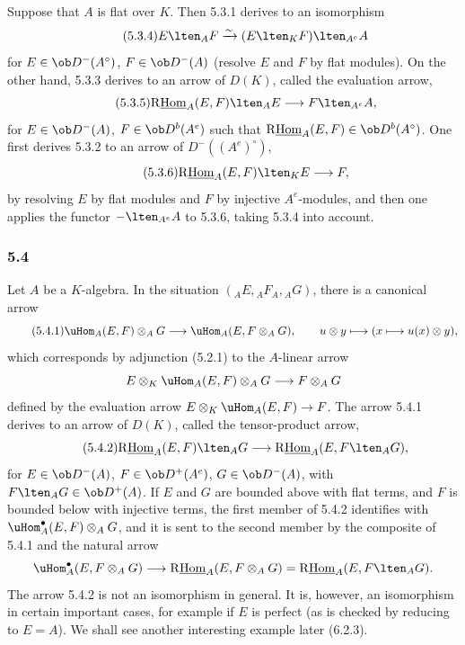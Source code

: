 Suppose that $A$ is flat over $K$. Then 5.3.1 derives to an isomorphism
\begin{equation}\tag{5.3.4}
E\lten_AF\xrightarrow{\sim}(E\lten_KF)\lten_{A^e}A
\end{equation}
for $E\in\ob D^-(A^\circ)$, $F\in\ob D^-(A)$ (resolve $E$ and $F$ by flat modules). On the other hand, 5.3.3 derives to an arrow of $D(K)$, called the evaluation arrow,
\begin{equation}\tag{5.3.5}
\mathrm{R}\underline{\mathrm{Hom}}_A(E,F)\lten_AE\longrightarrow F\lten_{A^e}A,
\end{equation}
for $E\in\ob D^-(A)$, $F\in\ob D^b(A^e)$ such that $\mathrm{R}\underline{\mathrm{Hom}}_A(E,F)\in\ob D^b(A^\circ)$. One first derives 5.3.2 to an arrow of $D^-((A^e)^\circ)$,
\begin{equation}\tag{5.3.6}
\mathrm{R}\underline{\mathrm{Hom}}_A(E,F)\lten_KE\longrightarrow F,
\end{equation}
by resolving $E$ by flat modules and $F$ by injective $A^e$-modules, and then one applies the functor $-\lten_{A^e}A$ to 5.3.6, taking 5.3.4 into account.

\subsubsection*{5.4}

Let $A$ be a $K$-algebra. In the situation $({}_AE,{}_AF_A,{}_AG)$, there is a canonical arrow
\begin{equation}\tag{5.4.1}
\uHom_A(E,F)\otimes_AG\longrightarrow\uHom_A(E,F\otimes_AG),
\qquad u\otimes y\longmapsto(x\longmapsto u(x)\otimes y),
\end{equation}
which corresponds by adjunction (5.2.1) to the $A$-linear arrow
\[
E\otimes_K\uHom_A(E,F)\otimes_AG\longrightarrow F\otimes_AG
\]
defined by the evaluation arrow $E\otimes_K\uHom_A(E,F)\to F$. The arrow 5.4.1 derives to an arrow of $D(K)$, called the tensor-product arrow,
\begin{equation}\tag{5.4.2}
\mathrm{R}\underline{\mathrm{Hom}}_A(E,F)\lten_AG\longrightarrow\mathrm{R}\underline{\mathrm{Hom}}_A(E,F\lten_AG),
\end{equation}
for $E\in\ob D^-(A)$, $F\in\ob D^+(A^e)$, $G\in\ob D^-(A)$, with $F\lten_AG\in\ob D^+(A)$. If $E$ and $G$ are bounded above with flat terms, and $F$ is bounded below with injective terms, the first member of 5.4.2 identifies with $\uHom_A^\bullet(E,F)\otimes_AG$, and it is sent to the second member by the composite of 5.4.1 and the natural arrow
\[
\uHom_A^\bullet(E,F\otimes_AG)\longrightarrow \mathrm{R}\underline{\mathrm{Hom}}_A(E,F\otimes_AG)=\mathrm{R}\underline{\mathrm{Hom}}_A(E,F\lten_AG).
\]
The arrow 5.4.2 is not an isomorphism in general. It is, however, an isomorphism in certain important cases, for example if $E$ is perfect (as is checked by reducing to $E=A$). We shall see another interesting example later (6.2.3).

